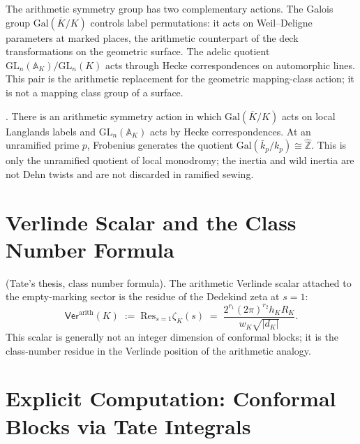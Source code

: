 \begin{observation}
\label{v4-arith:obs:MCG-decomposition}
The arithmetic symmetry group has two complementary actions.
The Galois group \(\mathrm{Gal}(\overline{K}/K)\) controls label permutations:
it acts on Weil--Deligne parameters at marked places, the arithmetic
counterpart of the deck transformations on the geometric surface.
The adelic quotient \(\mathrm{GL}_{n}(\mathbb{A}_{K})/\mathrm{GL}_{n}(K)\)
acts through Hecke correspondences on automorphic lines. This pair is
the arithmetic replacement for the geometric mapping-class action; it
is not a mapping class group of a surface.
\end{observation}

\begin{theorem}
\label{v4-arith:thm:arithmetic-MCG}
\ClaimStatusConjectured.
There is an arithmetic symmetry action in which
\(\mathrm{Gal}(\overline{K}/K)\) acts on local Langlands labels and
\(\mathrm{GL}_{n}(\mathbb{A}_{K})\) acts by Hecke correspondences. At
an unramified prime \(p\), Frobenius generates the quotient
\(\mathrm{Gal}(\bar{k}_{p}/k_{p})\cong\widehat{\mathbb{Z}}\). This is
only the unramified quotient of local monodromy; the inertia and wild
inertia are not Dehn twists and are not discarded in ramified sewing.
\end{theorem}

\section{Verlinde Scalar and the Class Number Formula}
\label{v4-arith:segal:verlinde}

\begin{theorem}
\label{v4-arith:thm:arithmetic-verlinde}
\ClaimStatusProvedElsewhere (Tate's thesis, class number formula).
The arithmetic Verlinde scalar attached to the empty-marking sector is
the residue of the Dedekind zeta at \(s=1\):
\begin{equation}
\boxed{\;\mathsf{Ver}^{\mathrm{arith}}(K)
\;:=\;\mathrm{Res}_{s=1}\zeta_{K}(s)\;=\;\frac{2^{r_{1}}(2\pi)^{r_{2}}h_{K}R_{K}}{w_{K}\sqrt{|d_{K}|}}.\;}
\end{equation}
This scalar is generally not an integer dimension of conformal blocks;
it is the class-number residue in the Verlinde position of the
arithmetic analogy.
\end{theorem}

\section{Explicit Computation: Conformal Blocks via Tate Integrals}
\label{v4-arith:segal:explicit-computation}

